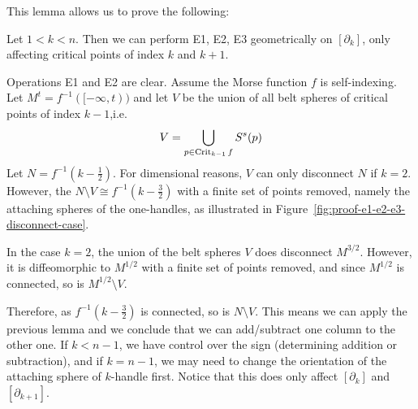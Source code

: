 This lemma allows us to prove the following:
\begin{theorem}
    Let $1 < k < n$. Then we can perform E1, E2, E3 geometrically on $[\partial_k]$, only affecting critical points of index $k$ and $k+1$.
\end{theorem}
\begin{myproof}
    Operations E1 and E2 are clear.
    Assume the Morse function $f$ is self-indexing.
    Let  $M^{t} = f^{-1}([-\infty, t))$ and let $V$ be the union of all belt spheres of critical points of index $k-1$,i.e. \[
        V = \bigcup_{p \in \operatorname{Crit}_{k-1} f} S^{s}(p)
    \]
    Let $N = f^{-1}(k - \frac{1}{2})$.
    For dimensional reasons, $V$ can only disconnect $N$ if  $k = 2$.
    However, the $N \setminus V \cong f^{-1}(k - \frac{3}{2})$ with a finite set of points removed, namely the attaching spheres of the one-handles, as illustrated in Figure~\ref{fig:proof-e1-e2-e3-disconnect-case}.
    \begin{marginfigure}
        \centering
        \caption{In the case $k = 2$, the union of the belt spheres $V$ does disconnect $M^{3 / 2}$. However, it is diffeomorphic to $M^{ 1 / 2}$ with a finite set of points removed, and since $M^{ 1 / 2}$ is connected, so is  $M^{ 1 / 2} \setminus V$.}
        \label{fig:proof-e1-e2-e3-disconnect-case}
    \end{marginfigure}
    Therefore, as $f^{-1}(k- \frac{3}{2})$ is connected, so is $N \setminus V$.
    This means we can apply the previous lemma and we conclude that we can add/subtract one column to the other one.
    If $k < n-1$, we have control over the sign (determining addition or subtraction), and if $k = n-1$, we may need to change the orientation of the attaching sphere of  $k$-handle first.
    Notice that this does only affect $[\partial_k]$ and $[\partial_{k+1}]$.
\end{myproof}

